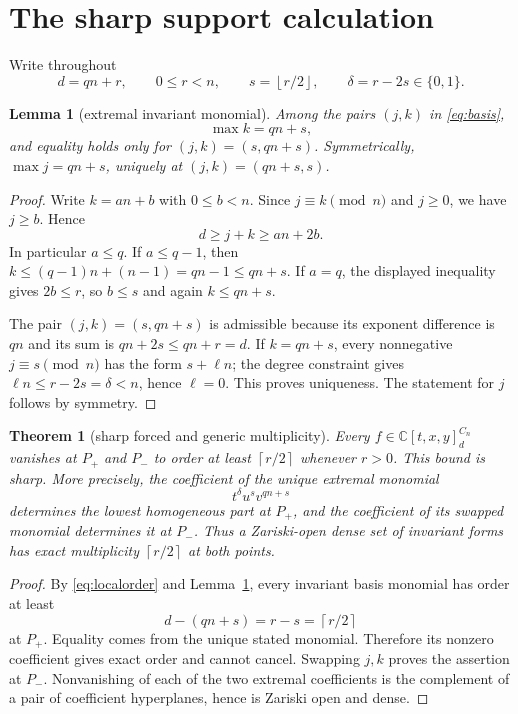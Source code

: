 \documentclass[11pt]{article}
\newtheorem{theorem}{Theorem}
\newtheorem{lemma}{Lemma}
\newcommand{\C}{\mathbb C}
\newcommand{\ceil}[1]{\left\lceil #1\right\rceil}
\newcommand{\floor}[1]{\left\lfloor #1\right\rfloor}
\begin{document}
\section{The sharp support calculation}

Write throughout
\[
   d=qn+r,\qquad 0\leq r<n,
   \qquad s=\floor{r/2},\qquad \delta=r-2s\in\{0,1\}.
\]

\begin{lemma}[extremal invariant monomial]\label{lem:support}
Among the pairs $(j,k)$ in \eqref{eq:basis},
\[
 \max k=qn+s,
\]
and equality holds only for $(j,k)=(s,qn+s)$.  Symmetrically,
$\max j=qn+s$, uniquely at $(j,k)=(qn+s,s)$.
\end{lemma}

\begin{proof}
Write $k=an+b$ with $0\leq b<n$.  Since $j\equiv k\pmod n$ and $j\geq0$,
we have $j\geq b$.  Hence
\[
 d\geq j+k\geq an+2b.
\]
In particular $a\leq q$.  If $a\leq q-1$, then
$k\leq(q-1)n+(n-1)=qn-1\leq qn+s$.  If $a=q$, the displayed inequality
gives $2b\leq r$, so $b\leq s$ and again $k\leq qn+s$.

The pair $(j,k)=(s,qn+s)$ is admissible because its exponent difference is
$qn$ and its sum is $qn+2s\leq qn+r=d$.  If $k=qn+s$, every nonnegative
$j\equiv s\pmod n$ has the form $s+\ell n$; the degree constraint gives
$\ell n\leq r-2s=\delta<n$, hence $\ell=0$.  This proves uniqueness.  The
statement for $j$ follows by symmetry.
\end{proof}

\begin{theorem}[sharp forced and generic multiplicity]\label{thm:generic}
Every $f\in\C[t,x,y]^{C_n}_d$ vanishes at $P_+$ and $P_-$ to order at least
$\ceil{r/2}$ whenever $r>0$.  This bound is sharp.  More precisely, the
coefficient of the unique extremal monomial
\[
 t^\delta u^s v^{qn+s}
\]
determines the lowest homogeneous part at $P_+$, and the coefficient of its
swapped monomial determines it at $P_-$.  Thus a Zariski-open dense set of
invariant forms has exact multiplicity $\ceil{r/2}$ at both points.
\end{theorem}

\begin{proof}
By \eqref{eq:localorder} and Lemma~\ref{lem:support}, every invariant basis
monomial has order at least
\[
 d-(qn+s)=r-s=\ceil{r/2}
\]
at $P_+$.  Equality comes from the unique stated monomial.  Therefore its
nonzero coefficient gives exact order and cannot cancel.  Swapping $j,k$
proves the assertion at $P_-$.  Nonvanishing of each of the two extremal
coefficients is the complement of a pair of coefficient hyperplanes, hence
is Zariski open and dense.
\end{proof}
\end{document}
